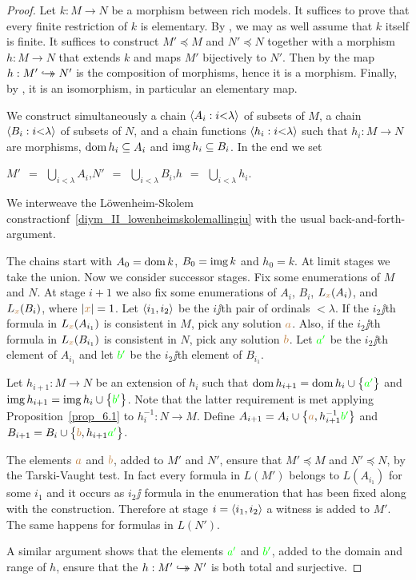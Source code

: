 \documentclass[creche.tex]{subfiles}
\begin{document}
\begin{proof}
Let $k:M\to N$ be a morphism between rich models. It suffices to prove that every finite restriction of $k$ is elementary. By , we may as well assume that $k$ itself is finite. It suffices to construct $M'\preceq M$ and  $N'\preceq N$ together with a morphism $h:M\to N$ that extends $k$ and maps $M'$ bijectively to $N'$. Then by  the map $h:M'\hookrightarrow\mathrel{\mspace{-15mu}}\rightarrow N'$ is the composition of morphisms, hence it is a morphism. Finally, by , it is an isomorphism, in particular an elementary map.

We construct simultaneously a chain $\langle A_i:i{<}\lambda\rangle$ of subsets of $M$, a chain $\langle B_i:i{<}\lambda\rangle$ of subsets of $N$, and a chain functions $\langle h_i:i{<}\lambda\rangle$ such that $h_i:M\to N$ are mor\-phisms, $\mathop{\rm dom} h_i\subseteq A_i$ and $\mathop{\rm img} h_i\subseteq B_i$. In the end we set

\hfil $\displaystyle M'\ \ =\ \ \bigcup_{i<\lambda}A_i$,\hfil $\displaystyle N'\ \ =\ \ \bigcup_{i<\lambda}B_i$,\hfil  $\displaystyle h\ \ =\ \ \bigcup_{i<\lambda}h_i$.

We interweave the Löwenheim-Skolem constractionf~\ref{diym_II_lowenheimskolemallingiu} with the usual back-and-forth-argument. 

The chains start with $A_0=\mathop{\rm dom} k$, $B_0=\mathop{\rm img} k$ and $h_0=k$. At limit stages we take the union. Now we consider successor stages. Fix some enumerations of $M$ and $N$. At stage $i+1$ we also fix some enumerations of $A_i$, $B_i$, $L_{\color{brown} x}(A_i)$, and $L_{\color{brown} x}(B_i)$, where $|{\color{brown} x}|=1$. Let $\langle i_1,i_2\rangle$ be the $i\jj$th pair of ordinals $<\lambda$. If the $i_2\jj$th formula in $L_{\color{brown} x}(A_{i_1})$ is consistent in $M$, pick any solution ${\color{brown} a}$. Also, if the $i_2\jj$th formula in $L_{\color{brown} x}(B_{i_1})$ is consistent in $N$, pick any solution ${\color{brown} b}$. Let ${\color{green} a'}$ be the $i_2\jj$th element of $A_{i_1}$ and let ${\color{green} b'}$ be the $i_2\jj$th element of $B_{i_1}$. 

Let $h_{i+1}:M\to N$ be an extension of $h_i$ such that $\mathop{\rm dom} h_{i+1}=\mathop{\rm dom} h_i\cup\big\{{\color{green} a'}\big\}$ and $\mathop{\rm img} h_{i+1}=\mathop{\rm img} h_i\cup\big\{{\color{green} b'}\big\}$. Note that the latter requirement is met applying Proposition~\ref{prop_6.1} to $h_i^{-1}:N\to M$. Define $A_{i+1}=A_i\cup\big\{{\color{brown} a},h_{i+1}^{-1}{\color{green} b'}\big\}$ and $B_{i+1}=B_i\cup\big\{{\color{brown} b},h_{i+1}{\color{green} a'}\big\}$.

The elements ${\color{brown} a}$ and ${\color{brown} b}$, added to $M'$ and $N'$, ensure that $M'\preceq M$ and $N'\preceq N$, by the Tarski-Vaught test. In fact every formula in $L(M')$ belongs to $L(A_{i_1})$ for some $i_1$ and it occurs as $i_2\jj$ formula in the enumeration that has been fixed along with the construction. Therefore at stage $i=\langle i_1,i_2\rangle$ a witness is added to $M'$. The same happens for formulas in $L(N')$. 

A similar argument shows that the elements ${\color{green} a'}$ and ${\color{green} b'}$, added to the domain and range of $h$, ensure that the $h:M'\hookrightarrow\mathrel{\mspace{-15mu}}\rightarrow N'$ is both total and surjective. 
\end{proof}
\end{document}
